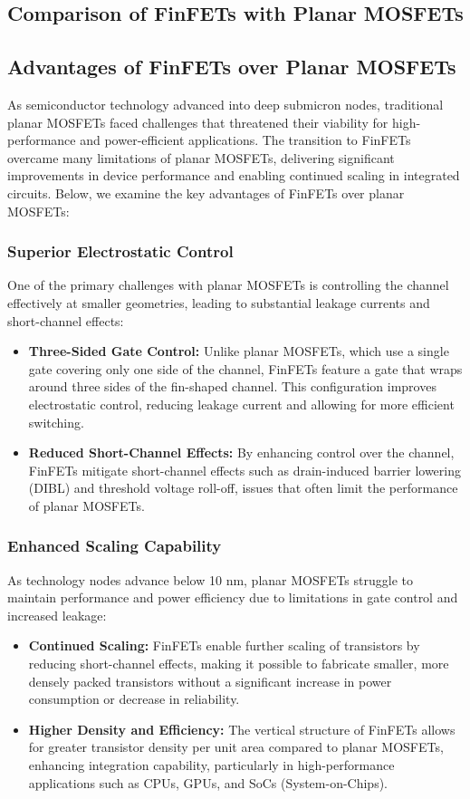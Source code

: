 \documentclass[12pt]{report}
\begin{document}
\begin{titlepage}
\section{Comparison of FinFETs with Planar MOSFETs}
\subsection{Advantages of FinFETs over Planar MOSFETs}
As semiconductor technology advanced into deep submicron nodes, traditional planar MOSFETs faced challenges that threatened their viability for high-performance and power-efficient applications. The transition to FinFETs overcame many limitations of planar MOSFETs, delivering significant improvements in device performance and enabling continued scaling in integrated circuits. Below, we examine the key advantages of FinFETs over planar MOSFETs:

\subsubsection{Superior Electrostatic Control}
One of the primary challenges with planar MOSFETs is controlling the channel effectively at smaller geometries, leading to substantial leakage currents and short-channel effects:
\begin{itemize}
    \item \textbf{Three-Sided Gate Control:} Unlike planar MOSFETs, which use a single gate covering only one side of the channel, FinFETs feature a gate that wraps around three sides of the fin-shaped channel. This configuration improves electrostatic control, reducing leakage current and allowing for more efficient switching.
    \item \textbf{Reduced Short-Channel Effects:} By enhancing control over the channel, FinFETs mitigate short-channel effects such as drain-induced barrier lowering (DIBL) and threshold voltage roll-off, issues that often limit the performance of planar MOSFETs.
\end{itemize}

\subsubsection{Enhanced Scaling Capability}
As technology nodes advance below 10 nm, planar MOSFETs struggle to maintain performance and power efficiency due to limitations in gate control and increased leakage:
\begin{itemize}
    \item \textbf{Continued Scaling:} FinFETs enable further scaling of transistors by reducing short-channel effects, making it possible to fabricate smaller, more densely packed transistors without a significant increase in power consumption or decrease in reliability.
    \item \textbf{Higher Density and Efficiency:} The vertical structure of FinFETs allows for greater transistor density per unit area compared to planar MOSFETs, enhancing integration capability, particularly in high-performance applications such as CPUs, GPUs, and SoCs (System-on-Chips).
\end{itemize}


\end{titlepage}
\end{document}
